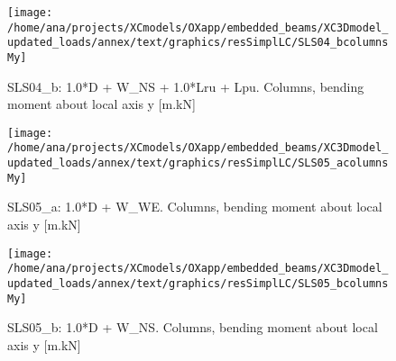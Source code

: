 \begin{figure}
\begin{center}
\texttt{[image: /home/ana/projects/XCmodels/OXapp/embedded\_beams/XC3Dmodel\_updated\_loads/annex/text/graphics/resSimplLC/SLS04\_bcolumnsMy]}
\caption{SLS04\_b: 1.0*D + W\_NS + 1.0*Lru + Lpu. Columns, bending moment about local axis y [m.kN]}
\end{center}
\end{figure}

\begin{figure}
\begin{center}
\texttt{[image: /home/ana/projects/XCmodels/OXapp/embedded\_beams/XC3Dmodel\_updated\_loads/annex/text/graphics/resSimplLC/SLS05\_acolumnsMy]}
\caption{SLS05\_a: 1.0*D + W\_WE. Columns, bending moment about local axis y [m.kN]}
\end{center}
\end{figure}

\begin{figure}
\begin{center}
\texttt{[image: /home/ana/projects/XCmodels/OXapp/embedded\_beams/XC3Dmodel\_updated\_loads/annex/text/graphics/resSimplLC/SLS05\_bcolumnsMy]}
\caption{SLS05\_b: 1.0*D + W\_NS. Columns, bending moment about local axis y [m.kN]}
\end{center}
\end{figure}

